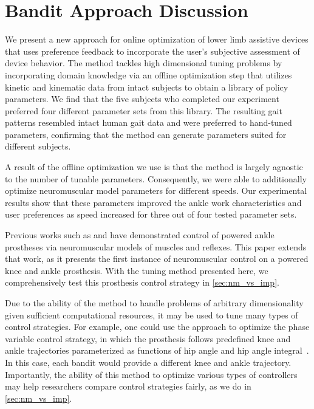 \section{Bandit Approach Discussion} 

We present a new approach for online optimization of lower limb assistive
devices that uses preference feedback to incorporate the user's subjective
assessment of device behavior. The method tackles high dimensional tuning
problems by incorporating domain knowledge via an offline optimization step that
utilizes kinetic and kinematic data from intact subjects to obtain a library of
policy parameters. We find that the five subjects who completed our experiment
preferred four different parameter sets from this library. The resulting gait
patterns resembled intact human gait data and were preferred to hand-tuned
parameters, confirming that the method can generate parameters suited for
different subjects.

A result of the offline optimization we use is that the method is largely
agnostic to the number of tunable parameters. Consequently, we were able to
additionally optimize neuromuscular model parameters for different speeds.  Our
experimental results show that these parameters improved the ankle work
characteristics and user preferences as speed increased for three out of four
tested parameter sets. 

Previous works such as \citet{eilenberg2010control} and
\citet{markowitz2011speed} have demonstrated control of powered ankle prostheses
via neuromuscular models of muscles and reflexes. This paper extends that work,
as it presents the first instance of neuromuscular control on a powered knee and
ankle prosthesis. With the tuning method presented here, we comprehensively test
this prosthesis control strategy in \cref{sec:nm_vs_imp}.

Due to the ability of the method to handle problems of arbitrary dimensionality
given sufficient computational resources, it may be used to tune many types of
control strategies. For example, one could use the approach to optimize the
phase variable control strategy, in which the prosthesis follows predefined knee
and ankle trajectories parameterized as functions of hip angle and hip angle
integral~\citep{quintero2016preliminary}. In this case, each bandit would
provide a different knee and ankle trajectory.  Importantly, the ability of this
method to optimize various types of controllers may help researchers compare
control strategies fairly, as we do in \cref{sec:nm_vs_imp}.

